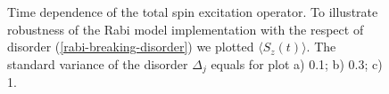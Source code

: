 \documentclass[reprint, aps, prx, amsmath, amssymb, longbibliography, superscriptaddress]{revtex4-2}
\begin{document}
\begin{figure}[t]
    \captionsetup[subfloat]{captionskip=-135pt} %
    \centering
    \caption{Time dependence of the total spin excitation operator. To illustrate robustness of the Rabi model implementation with the respect of disorder (\ref{rabi-breaking-disorder}) we plotted $\langle S_z(t) \rangle$. The standard variance of the disorder $\Delta_j$ equals for plot a) 0.1; b) 0.3; c) 1.}
    \label{fig:spin-excitation-plot}
\end{figure}
\end{document}
